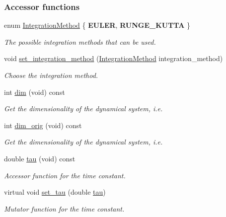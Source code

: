 \subsubsection*{Accessor functions}
\begin{DoxyCompactItemize}
\item 
enum \hyperlink{group__DynamicalSystems_ga9eca50997f7f604b063d2cb1874f5fef}{Integration\+Method} \{ {\bfseries E\+U\+L\+E\+R}, 
{\bfseries R\+U\+N\+G\+E\+\_\+\+K\+U\+T\+T\+A}
 \}
\begin{DoxyCompactList}\small\item\em The possible integration methods that can be used. \end{DoxyCompactList}\item 
void \hyperlink{group__DynamicalSystems_ga07a2df4cc46a521ab81c614d79b33669}{set\+\_\+integration\+\_\+method} (\hyperlink{group__DynamicalSystems_ga9eca50997f7f604b063d2cb1874f5fef}{Integration\+Method} integration\+\_\+method)
\begin{DoxyCompactList}\small\item\em Choose the integration method. \end{DoxyCompactList}\item 
int \hyperlink{group__DynamicalSystems_ga6f628f7f4ed9d77bf69f5b8560b98f18}{dim} (void) const 
\begin{DoxyCompactList}\small\item\em Get the dimensionality of the dynamical system, i.\+e. \end{DoxyCompactList}\item 
int \hyperlink{group__DynamicalSystems_ga93d7cbbf2e471b00f124e41706405a05}{dim\+\_\+orig} (void) const 
\begin{DoxyCompactList}\small\item\em Get the dimensionality of the dynamical system, i.\+e. \end{DoxyCompactList}\item 
double \hyperlink{group__DynamicalSystems_ga50eec7ad4c9664b5809ace45b22200d5}{tau} (void) const 
\begin{DoxyCompactList}\small\item\em Accessor function for the time constant. \end{DoxyCompactList}\item 
virtual void \hyperlink{group__DynamicalSystems_ga91155da280310b176cbd5fc1627820c7}{set\+\_\+tau} (double \hyperlink{group__DynamicalSystems_ga50eec7ad4c9664b5809ace45b22200d5}{tau})
\begin{DoxyCompactList}\small\item\em Mutator function for the time constant. \end{DoxyCompactList}\item 

\end{DoxyCompactItemize}
